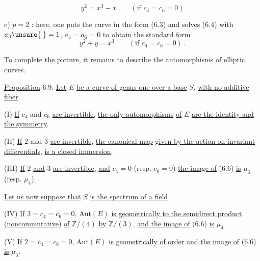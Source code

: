 %
%
\[
y^2=x^3-x \qquad (\text{if }c_4=c_6=0) \tag*{(6.7)}
\]

c) $p=2$ : here, one puts the curve in the form (6.3) and solves (6.4) with $a_3\unsure{\cdot}=1$, $a_4=a_6=0$ to obtain the standard form
\[
y^2+y=x^3 \qquad (\text{if }c_4=c_6=0) \, . \tag*{(6.8)}
\]

To complete the picture, it remains to describe the automorphisms of elliptic curves.

\uline{Proposition} 6.9. \quad \uline{Let} $E$ \uline{be a curve of genus one over a base} $S$, \uline{with no additive fiber}.

(I) \quad \uline{If} $c_4$ and $c_6$ \uline{are invertible,} \uline{the only automorphisms} \uline{of} $E$ \uline{are the identity and the symmetry}.

(II) \quad \uline{If} $2$ and $3$ \uline{are invertible}, \uline{the canonical map}
\uline{given by the action on invariant differentials}, \uline{is a closed immersion}.

(III) \uline{If} $2$ \uline{and} $3$ \uline{are invertible}, \uline{and} $c_4=0$ (resp. $c_6=0$) \uline{the image of} (6.6) \uline{is} $\mu_6$ (resp. $\mu_4$).

\uline{Let us now suppose that} $S$ \uline{is the spectrum of a field}

(IV) \quad \uline{If} $3=c_4=c_6=0$, $\mathrm{Aut}(E)$ \uline{is geometrically  to the semidirect product} (\uline{noncommutative}) \uline{of} $\mathbb{Z}/(4)$ \uline{by} $\mathbb{Z}/(3)$, \uline{and the image of} (6.6) \uline{is} $\mu_4$ .

(V) \quad \uline{If} $2=c_4=c_6=0$, $\mathrm{Aut}(E)$ \uline{is geometrically of order}  \uline{and the image of} (6.6) \uline{is} $\mu_3$.
